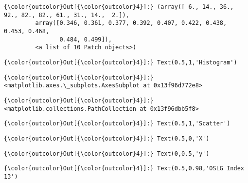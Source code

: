 \documentclass[11pt]{article}
\begin{document}
\begin{Verbatim}[commandchars=\\\{\}]
{\color{outcolor}Out[{\color{outcolor}4}]:} (array([ 6., 14., 36., 92., 82., 82., 61., 31., 14.,  2.]),
         array([0.346, 0.361, 0.377, 0.392, 0.407, 0.422, 0.438, 0.453, 0.468,
                0.484, 0.499]),
         <a list of 10 Patch objects>)
\end{Verbatim}
            
\begin{Verbatim}[commandchars=\\\{\}]
{\color{outcolor}Out[{\color{outcolor}4}]:} Text(0.5,1,'Histogram')
\end{Verbatim}
            
\begin{Verbatim}[commandchars=\\\{\}]
{\color{outcolor}Out[{\color{outcolor}4}]:} <matplotlib.axes.\_subplots.AxesSubplot at 0x13f96d772e8>
\end{Verbatim}
            
\begin{Verbatim}[commandchars=\\\{\}]
{\color{outcolor}Out[{\color{outcolor}4}]:} <matplotlib.collections.PathCollection at 0x13f96dbb5f8>
\end{Verbatim}
            
\begin{Verbatim}[commandchars=\\\{\}]
{\color{outcolor}Out[{\color{outcolor}4}]:} Text(0.5,1,'Scatter')
\end{Verbatim}
            
\begin{Verbatim}[commandchars=\\\{\}]
{\color{outcolor}Out[{\color{outcolor}4}]:} Text(0.5,0,'X')
\end{Verbatim}
            
\begin{Verbatim}[commandchars=\\\{\}]
{\color{outcolor}Out[{\color{outcolor}4}]:} Text(0,0.5,'y')
\end{Verbatim}
            
\begin{Verbatim}[commandchars=\\\{\}]
{\color{outcolor}Out[{\color{outcolor}4}]:} Text(0.5,0.98,'OSLG Index 13')
\end{Verbatim}
            
    \begin{center}
    \end{center}
    { \hspace*{\fill} \\}
    
\end{document}
